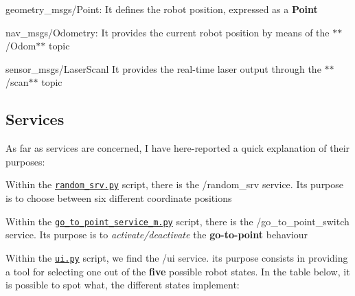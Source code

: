 \begin{DoxyItemize}
\item {\ttfamily geometry\+\_\+msgs/\+Point}\+: It defines the robot position, expressed as a {\bfseries Point}
\item {\ttfamily nav\+\_\+msgs/\+Odometry}\+: It provides the current robot position by means of the $\ast$$\ast$/\+Odom$\ast$$\ast$ topic
\item {\ttfamily sensor\+\_\+msgs/\+Laser\+Scanl} It provides the real-\/time laser output through the $\ast$$\ast$/scan$\ast$$\ast$ topic
\end{DoxyItemize}

\subsection*{Services}

As far as services are concerned, I have here-\/reported a quick explanation of their purposes\+:


\begin{DoxyEnumerate}
\item Within the \href{https://github.com/fedehub/final_assignment/tree/main/scripts/random_srv.py}{\tt random\+\_\+srv.\+py} script, there is the {\ttfamily /random\+\_\+srv} service. Its purpose is to choose between six different coordinate positions
\item Within the \href{https://github.com/fedehub/final_assignment/tree/main/scripts/go_to_point_service_m.py}{\tt go\+\_\+to\+\_\+point\+\_\+service\+\_\+m.\+py} script, there is the {\ttfamily /go\+\_\+to\+\_\+point\+\_\+switch} service. Its purpose is to {\itshape activate/deactivate} the {\bfseries go-\/to-\/point} behaviour
\item Within the \href{https://github.com/fedehub/final_assignment/tree/main/scripts/ui.py}{\tt ui.\+py} script, we find the {\ttfamily /ui} service. its purpose consists in providing a tool for selecting one out of the {\bfseries five} possible robot states. In the table below, it is possible to spot what, the different states implement\+:
\end{DoxyEnumerate}

